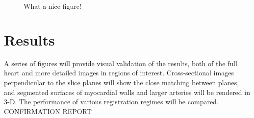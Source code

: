       \begin{figure}[p]
        \centering
        \caption{What a nice figure!}
        \label{fig:0562_correlation}
      \end{figure}
      
      
   
\section{Results}
  A series of figures will provide visual validation of the results, both of the full heart and more detailed images in regions of interest. Cross-sectional images perpendicular to the slice planes will show the close matching between planes, and segmented surfaces of myocardial walls and larger arteries will be rendered in 3-D. The performance of various registration regimes will be compared.
CONFIRMATION REPORT

